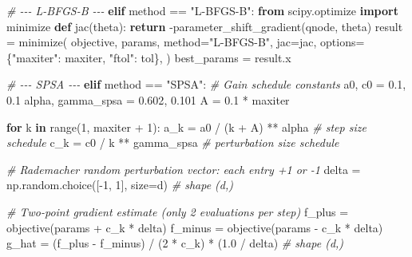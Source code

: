 \documentclass[
  11pt,
]{report}
\newenvironment{Shaded}{}{}
\newcommand{\BuiltInTok}[1]{\textcolor[rgb]{0.00,0.50,0.00}{#1}}
\newcommand{\CommentTok}[1]{\textcolor[rgb]{0.38,0.63,0.69}{\textit{#1}}}
\newcommand{\ControlFlowTok}[1]{\textcolor[rgb]{0.00,0.44,0.13}{\textbf{#1}}}
\newcommand{\DecValTok}[1]{\textcolor[rgb]{0.25,0.63,0.44}{#1}}
\newcommand{\FloatTok}[1]{\textcolor[rgb]{0.25,0.63,0.44}{#1}}
\newcommand{\ImportTok}[1]{\textcolor[rgb]{0.00,0.50,0.00}{\textbf{#1}}}
\newcommand{\KeywordTok}[1]{\textcolor[rgb]{0.00,0.44,0.13}{\textbf{#1}}}
\newcommand{\NormalTok}[1]{#1}
\newcommand{\OperatorTok}[1]{\textcolor[rgb]{0.40,0.40,0.40}{#1}}
\newcommand{\StringTok}[1]{\textcolor[rgb]{0.25,0.44,0.63}{#1}}
\begin{document}
\begin{Shaded}
\begin{Highlighting}[]
    \CommentTok{\# {-}{-}{-} L{-}BFGS{-}B {-}{-}{-}}
    \ControlFlowTok{elif}\NormalTok{ method }\OperatorTok{==} \StringTok{"L{-}BFGS{-}B"}\NormalTok{:}
        \ImportTok{from}\NormalTok{ scipy.optimize }\ImportTok{import}\NormalTok{ minimize}
        \KeywordTok{def}\NormalTok{ jac(theta):}
            \ControlFlowTok{return} \OperatorTok{{-}}\NormalTok{parameter\_shift\_gradient(qnode, theta)}
\NormalTok{        result }\OperatorTok{=}\NormalTok{ minimize(}
\NormalTok{            objective, params, method}\OperatorTok{=}\StringTok{"L{-}BFGS{-}B"}\NormalTok{, jac}\OperatorTok{=}\NormalTok{jac,}
\NormalTok{            options}\OperatorTok{=}\NormalTok{\{}\StringTok{"maxiter"}\NormalTok{: maxiter, }\StringTok{"ftol"}\NormalTok{: tol\},}
\NormalTok{        )}
\NormalTok{        best\_params }\OperatorTok{=}\NormalTok{ result.x}

    \CommentTok{\# {-}{-}{-} SPSA {-}{-}{-}}
    \ControlFlowTok{elif}\NormalTok{ method }\OperatorTok{==} \StringTok{"SPSA"}\NormalTok{:}
        \CommentTok{\# Gain schedule constants}
\NormalTok{        a0, c0 }\OperatorTok{=} \FloatTok{0.1}\NormalTok{, }\FloatTok{0.1}
\NormalTok{        alpha, gamma\_spsa }\OperatorTok{=} \FloatTok{0.602}\NormalTok{, }\FloatTok{0.101}
\NormalTok{        A }\OperatorTok{=} \FloatTok{0.1} \OperatorTok{*}\NormalTok{ maxiter}

        \ControlFlowTok{for}\NormalTok{ k }\KeywordTok{in} \BuiltInTok{range}\NormalTok{(}\DecValTok{1}\NormalTok{, maxiter }\OperatorTok{+} \DecValTok{1}\NormalTok{):}
\NormalTok{            a\_k }\OperatorTok{=}\NormalTok{ a0 }\OperatorTok{/}\NormalTok{ (k }\OperatorTok{+}\NormalTok{ A) }\OperatorTok{**}\NormalTok{ alpha       }\CommentTok{\# step size schedule}
\NormalTok{            c\_k }\OperatorTok{=}\NormalTok{ c0 }\OperatorTok{/}\NormalTok{ k }\OperatorTok{**}\NormalTok{ gamma\_spsa         }\CommentTok{\# perturbation size schedule}

            \CommentTok{\# Rademacher random perturbation vector: each entry +1 or {-}1}
\NormalTok{            delta }\OperatorTok{=}\NormalTok{ np.random.choice([}\OperatorTok{{-}}\DecValTok{1}\NormalTok{, }\DecValTok{1}\NormalTok{], size}\OperatorTok{=}\NormalTok{d)   }\CommentTok{\# shape (d,)}

            \CommentTok{\# Two{-}point gradient estimate (only 2 evaluations per step)}
\NormalTok{            f\_plus }\OperatorTok{=}\NormalTok{ objective(params }\OperatorTok{+}\NormalTok{ c\_k }\OperatorTok{*}\NormalTok{ delta)}
\NormalTok{            f\_minus }\OperatorTok{=}\NormalTok{ objective(params }\OperatorTok{{-}}\NormalTok{ c\_k }\OperatorTok{*}\NormalTok{ delta)}
\NormalTok{            g\_hat }\OperatorTok{=}\NormalTok{ (f\_plus }\OperatorTok{{-}}\NormalTok{ f\_minus) }\OperatorTok{/}\NormalTok{ (}\DecValTok{2} \OperatorTok{*}\NormalTok{ c\_k) }\OperatorTok{*}\NormalTok{ (}\FloatTok{1.0} \OperatorTok{/}\NormalTok{ delta)  }\CommentTok{\# shape (d,)}


\end{Highlighting}
\end{Shaded}
\end{document}
